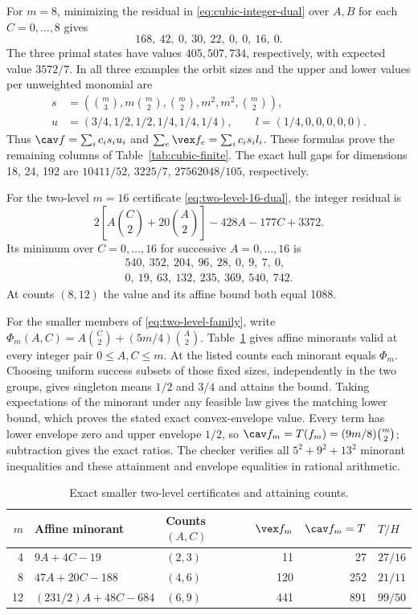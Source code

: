 For $m=8$, minimizing the residual in
\eqref{eq:cubic-integer-dual} over $A,B$ for each $C=0,\ldots,8$ gives
\[
 168,\ 42,\ 0,\ 30,\ 22,\ 0,\ 0,\ 16,\ 0.
\]
The three primal states have values $405,507,734$, respectively, with
expected value $3572/7$. In all three examples the orbit sizes and the
upper and lower values per unweighted monomial are
\begin{align*}
 s&=\left(\binom m3,m\binom m2,\binom m2,m^2,m^2,\binom m2\right),\\
 u&=(3/4,1/2,1/2,1/4,1/4,1/4),\qquad
 l=(1/4,0,0,0,0,0).
\end{align*}
Thus $\cav f=\sum_ic_is_iu_i$ and $\sum_e\vex f_e=\sum_ic_is_il_i$.
These formulas prove the remaining columns of
Table~\ref{tab:cubic-finite}. The exact hull gaps for dimensions
18, 24, 192 are $10411/52$, $3225/7$, $27562048/105$, respectively.

For the two-level $m=16$ certificate
\eqref{eq:two-level-16-dual}, the integer residual is
\[
 2\left[A\binom C2+20\binom A2\right]-428A-177C+3372.
\]
Its minimum over $C=0,\ldots,16$ for successive $A=0,\ldots,16$ is
\[
\begin{gathered}
 540,\ 352,\ 204,\ 96,\ 28,\ 0,\ 9,\ 7,\ 0,\\
 0,\ 19,\ 63,\ 132,\ 235,\ 369,\ 540,\ 742.
\end{gathered}
\]
At counts $(8,12)$ the value and its affine bound both equal 1088.

For the smaller members of \eqref{eq:two-level-family}, write
$\Phi_m(A,C)=A\binom C2+(5m/4)\binom A2$.
Table~\ref{tab:two-level-small} gives affine minorants valid at every
integer pair $0\le A,C\le m$. At the listed counts each minorant equals
$\Phi_m$. Choosing uniform success subsets of those fixed sizes,
independently in the two groups, gives singleton means $1/2$ and $3/4$
and attains the bound. Taking expectations of the minorant under any
feasible law gives the matching lower bound, which proves the stated
exact convex-envelope value. Every term has
lower envelope zero and upper envelope $1/2$, so
$\cav f_m=T(f_m)=(9m/8)\binom m2$; subtraction gives the exact ratios.
The checker verifies all $5^2+9^2+13^2$ minorant inequalities and these
attainment and envelope equalities in rational arithmetic.

\begin{table}[htbp]
\centering
\begin{tabular}{rllrrl}
\toprule
$m$&Affine minorant&Counts $(A,C)$&$\vex f_m$&$\cav f_m=T$&$T/H$\\\midrule
4&$9A+4C-19$&$(2,3)$&11&27&$27/16$\\
8&$47A+20C-188$&$(4,6)$&120&252&$21/11$\\
12&$(231/2)A+48C-684$&$(6,9)$&441&891&$99/50$\\\bottomrule
\end{tabular}
\caption{Exact smaller two-level certificates and attaining counts.}
\label{tab:two-level-small}
\end{table}

